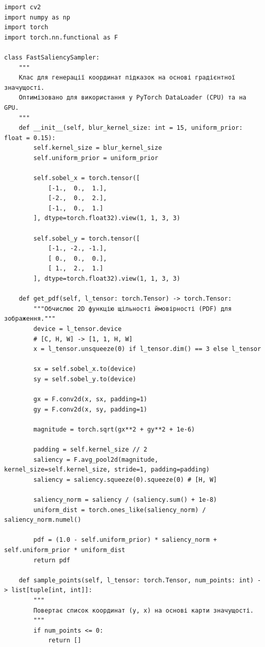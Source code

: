\begin{lstlisting}[caption={Класи просторового семплювання координат (PyTorch, OpenCV)}]
import cv2
import numpy as np
import torch
import torch.nn.functional as F

class FastSaliencySampler:
    """
    Клас для генерації координат підказок на основі градієнтної значущості.
    Оптимізовано для використання у PyTorch DataLoader (CPU) та на GPU.
    """
    def __init__(self, blur_kernel_size: int = 15, uniform_prior: float = 0.15):
        self.kernel_size = blur_kernel_size
        self.uniform_prior = uniform_prior

        self.sobel_x = torch.tensor([
            [-1.,  0.,  1.], 
            [-2.,  0.,  2.], 
            [-1.,  0.,  1.]
        ], dtype=torch.float32).view(1, 1, 3, 3)
                                     
        self.sobel_y = torch.tensor([
            [-1., -2., -1.], 
            [ 0.,  0.,  0.], 
            [ 1.,  2.,  1.]
        ], dtype=torch.float32).view(1, 1, 3, 3)

    def get_pdf(self, l_tensor: torch.Tensor) -> torch.Tensor:
        """Обчислює 2D функцію щільності ймовірності (PDF) для зображення."""
        device = l_tensor.device
        # [C, H, W] -> [1, 1, H, W]
        x = l_tensor.unsqueeze(0) if l_tensor.dim() == 3 else l_tensor

        sx = self.sobel_x.to(device)
        sy = self.sobel_y.to(device)
        
        gx = F.conv2d(x, sx, padding=1)
        gy = F.conv2d(x, sy, padding=1)
        
        magnitude = torch.sqrt(gx**2 + gy**2 + 1e-6)
        
        padding = self.kernel_size // 2
        saliency = F.avg_pool2d(magnitude, kernel_size=self.kernel_size, stride=1, padding=padding)
        saliency = saliency.squeeze(0).squeeze(0) # [H, W]
        
        saliency_norm = saliency / (saliency.sum() + 1e-8)
        uniform_dist = torch.ones_like(saliency_norm) / saliency_norm.numel()
        
        pdf = (1.0 - self.uniform_prior) * saliency_norm + self.uniform_prior * uniform_dist
        return pdf

    def sample_points(self, l_tensor: torch.Tensor, num_points: int) -> list[tuple[int, int]]:
        """
        Повертає список координат (y, x) на основі карти значущості.
        """
        if num_points <= 0:
            return []
            

\end{lstlisting}
